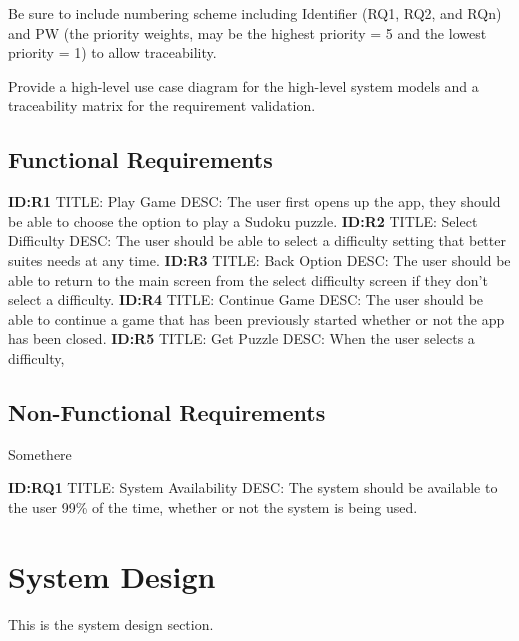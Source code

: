 \documentclass{article}
\begin{document}
Be sure to include numbering scheme including Identifier (RQ1, RQ2, and RQn) and PW (the priority weights, may be the highest priority = 5 and the lowest priority = 1) to allow traceability.

Provide a high-level use case diagram for the high-level system models and a traceability matrix for the requirement validation.
 
\subsection{Functional Requirements}

\textbf{ID:R1} \newline TITLE: Play Game \newline DESC: The user first opens up the app, they should be able to choose the option to play a Sudoku puzzle. \newline
\textbf{ID:R2} \newline TITLE: Select Difficulty \newline DESC: The user should be able to select a difficulty setting that better suites needs at any time.
\textbf{ID:R3} \newline TITLE: Back Option \newline DESC: The user should be able to return to the main screen from the select difficulty screen if they don't select a difficulty.\newline
\textbf{ID:R4} \newline TITLE: Continue Game \newline DESC: The user should be able to continue a game that has been previously started whether or not the app has been closed. \newline 
\textbf{ID:R5} \newline TITLE: Get Puzzle \newline DESC: When the user selects a difficulty, 


\subsection{Non-Functional Requirements} 
Somethere

\textbf{ID:RQ1} \newline TITLE: System Availability \newline DESC: The system should be available to the user 99\% of the time, whether or not the system is being used.


\section{System Design}
This is the system design section.
\end{document}
